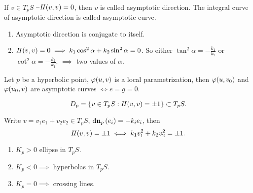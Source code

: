 \begin{definition}\hfill\\
    If \(v\in T_p S\) \st\ \(I\!I(v,v)=0\), then \(v\) is called asymptotic
    direction. The integral curve of asymptotic direction is called asymptotic
    curve.
\end{definition}
\begin{remark}
\begin{enumerate}[(1)]
    \item Asymptotic direction is conjugate to itself.
    \item \(I\!I(v,v)=0\implies k_1\cos^2\alpha+k_2\sin^2\alpha=0\). So either
        \(\tan^2\alpha=-\frac{k_1}{k_2}\) or \(\cot^2\alpha=-\frac{k_2}{k_1}\).
        \(\implies \) two values of \(\alpha\).
\end{enumerate}
\end{remark}

\begin{exercise}
    Let \(p\) be a hyperbolic point, \(\varphi(u,v)\) is a local parametrization,
    then \(\varphi(u,v_0)\) and \(\varphi(u_0,v)\) are asymptotic curves 
    \(\iff e=g=0\).
\end{exercise}

\begin{definition}
    \[
        D_p=\{v\in T_p S:I\!I(v,v)=\pm 1\}\subset T_p S
    .\] 
\end{definition}
\begin{remark}
    Write \(v=v_1e_1+v_2e_2\in T_p S\), \(\dd{\vb{n}}_p(e_i)=-k_ie_i\), then \[
        I\!I(v,v)=\pm 1\iff k_1v_1^2+k_2v_2^2=\pm 1
    .\] 
    \begin{enumerate}[(1)]
        \item \(K_p>0\) ellipse in \(T_p S\).
        \item \(K_p<0\implies \) hyperbolas in \(T_p S\).
        \item \(K_p=0\implies \) crossing lines.
    \end{enumerate}
\end{remark}
